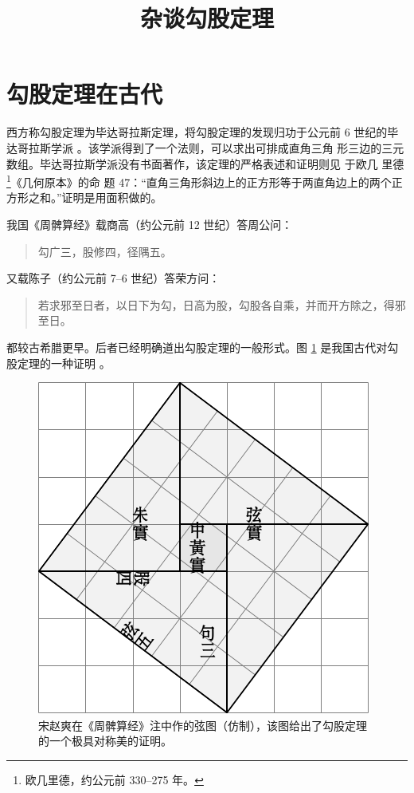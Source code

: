 \documentclass[UTF8]{ctexart}
\title{\heiti 杂谈勾股定理}
\date{}
\newenvironment{myquote}
  {\begin{quote}\kaishu\zihao{-5}}
  {\end{quote}}
\begin{document}
\maketitle



\section{勾股定理在古代}
\label{sec:ancient}

西方称勾股定理为毕达哥拉斯定理，将勾股定理的发现归功于公元前 6 世纪的毕
达哥拉斯学派 \cite{Kline}。该学派得到了一个法则，可以求出可排成直角三角
形三边的三元数组。毕达哥拉斯学派没有书面著作，该定理的严格表述和证明则见
于欧几
里德\footnote{欧几里德，约公元前 330--275 年。}《几何原本》的命
题 47：“直角三角形斜边上的正方形等于两直角边上的两个正方形之和。”证明是用面积做的。

我国《周髀算经》载商高（约公元前 12 世纪）答周公问：
\begin{myquote}
勾广三，股修四，径隅五。
\end{myquote}
又载陈子（约公元前 7--6 世纪）答荣方问：
\begin{myquote}
若求邪至日者，以日下为勾，日高为股，勾股各自乘，并而开方除之，得邪至日。
\end{myquote}
都较古希腊更早。后者已经明确道出勾股定理的一般形式。图 \ref{fig:xiantu} 是我国古代对勾股定理的一种证明 \cite{quanjing}。
\begin{figure}[ht]
  \centering
  \includegraphics[scale=0.6]{image/xiantu.pdf}
  \caption{宋赵爽在《周髀算经》注中作的弦图（仿制），该图给出了勾股定理的一个极具对称美的证明。}
  \label{fig:xiantu}
\end{figure}
\end{document}
